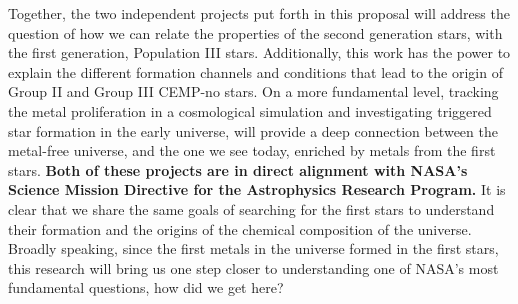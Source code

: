 \documentclass[12pt]{article}
\begin{document}
Together, the two independent projects put forth in this proposal will address the question of how we can relate the properties of the second generation stars, with the first generation, Population III stars. Additionally, this work has the power to explain the different formation channels and conditions that lead to the origin of Group II and Group III CEMP-no stars. On a more fundamental level, tracking the metal proliferation in a cosmological simulation and investigating triggered star formation in the early universe, will provide a deep connection between the metal-free universe, and the one we see today, enriched by metals from the first stars. \textbf{Both of these projects are in direct alignment with NASA's Science Mission Directive for the Astrophysics Research Program.} It is clear that we share the same goals of searching for the first stars to understand their formation and the origins of the chemical composition of the universe. Broadly speaking, since the first metals in the universe formed in the first stars, this research will bring us one step closer to understanding one of NASA's most fundamental questions, how did we get here?




\end{document}
